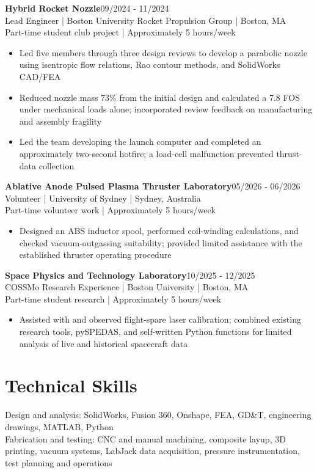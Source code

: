 \documentclass[letterpaper,10pt]{article}
\begin{document}
\textbf{Hybrid Rocket Nozzle}\hfill 09/2024 - 11/2024\\
Lead Engineer | Boston University Rocket Propulsion Group | Boston, MA\\
Part-time student club project | Approximately 5 hours/week
\begin{itemize}[leftmargin=12pt,itemsep=2pt,topsep=2pt,parsep=0pt]
\item Led five members through three design reviews to develop a parabolic nozzle using isentropic flow relations, Rao contour methods, and SolidWorks CAD/FEA
\item Reduced nozzle mass 73\% from the initial design and calculated a 7.8 FOS under mechanical loads alone; incorporated review feedback on manufacturing and assembly fragility
\item Led the team developing the launch computer and completed an approximately two-second hotfire; a load-cell malfunction prevented thrust-data collection
\end{itemize}
\textbf{Ablative Anode Pulsed Plasma Thruster Laboratory}\hfill 05/2026 - 06/2026\\
Volunteer | University of Sydney | Sydney, Australia\\
Part-time volunteer work | Approximately 5 hours/week
\begin{itemize}[leftmargin=12pt,itemsep=2pt,topsep=2pt,parsep=0pt]
\item Designed an ABS inductor spool, performed coil-winding calculations, and checked vacuum-outgassing suitability; provided limited assistance with the established thruster operating procedure
\end{itemize}
\textbf{Space Physics and Technology Laboratory}\hfill 10/2025 - 12/2025\\
COSSMo Research Experience | Boston University | Boston, MA\\
Part-time student research | Approximately 5 hours/week
\begin{itemize}[leftmargin=12pt,itemsep=2pt,topsep=2pt,parsep=0pt]
\item Assisted with and observed flight-spare laser calibration; combined existing research tools, pySPEDAS, and self-written Python functions for limited analysis of live and historical spacecraft data
\end{itemize}
\section*{Technical Skills}
Design and analysis: SolidWorks, Fusion 360, Onshape, FEA, GD\&T, engineering drawings, MATLAB, Python\\
Fabrication and testing: CNC and manual machining, composite layup, 3D printing, vacuum systems, LabJack data acquisition, pressure instrumentation, test planning and operations\\
\end{document}
